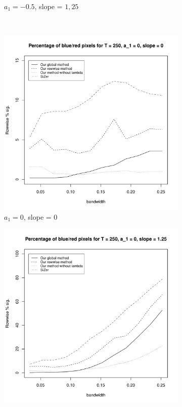 \documentclass[a4paper,12pt]{article}
\begin{document}
\begin{figure}[t!]
\begin{subfigure}[b]{0.475\textwidth}
\caption{$a_1 = -0.5$, slope = $1,25$}
\end{subfigure}\\
\begin{subfigure}[b]{0.475\textwidth}
\includegraphics[width=\textwidth]{Plots/rowwise_sig_comparison_T_250_a1_0_slope_0.pdf}
\caption{$a_1 = 0$, slope = $0$}
\end{subfigure}\hspace{0.25cm}
\begin{subfigure}[b]{0.475\textwidth}
\includegraphics[width=\textwidth]{Plots/rowwise_sig_comparison_T_250_a1_0_slope_125.pdf}

\end{subfigure}
\end{figure}
\end{document}
